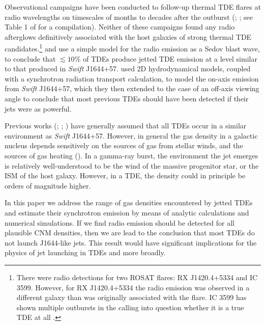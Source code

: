 \documentclass[usenatbib,fleqn]{mnras}
\begin{document}
Observational campaigns have been conducted to follow-up thermal TDE
flares at radio wavelengths on timescales of months to decades after
the outburst (\citealt{Bower+2013}; \citealt{van-Velzen+2013}; see
Table 1 of \citet{Mimica+2015} for a compilation). Neither of these
campaigns found any radio afterglows definitively associated with the
host galaxies of strong thermal TDE candidates.\footnote{There were
  radio detections for two ROSAT flares: RX J1420.4+5334 and IC
  3599. However, for RX J1420.4+5334 the radio emission was observed
  in a different galaxy than was originally associated with the flare.
  IC 3599 has shown multiple outbursts in the calling into question
  whether it is a true TDE at all \citep{Campana+2015}.}
\citet{Bower+2013} and \citet{van-Velzen+2013} use a simple model for
the radio emission as a Sedov blast wave, to conclude that $\lesssim
10\%$ of TDEs produce jetted TDE emission at a level similar to that
produced in {\it Swift} J1644+57.  \citet{Mimica+2015} used 2D
hydrodynamical models, coupled with a synchrotron radiation transport
calculation, to model the on-axis emission from {\it Swift} J1644+57,
which they then extended to the case of an off-axis viewing angle to
conclude that most previous TDEs should have been detected if their
jets were as powerful.

Previous works (\citet{Bower+2013}; \citet{van-Velzen+2013};
\citealt{Mimica+2015}) have generally assumed that all TDEs occur in a
similar environment as {\it Swift} J1644+57.  However, in general the
gas density in a galactic nucleus depends sensitively on the sources
of gas from stellar winds, and the sources of gas heating
(\citealt{Quataert2004,Generozov+2015}).  In a gamma-ray
burst, the environment the jet emerges is relatively well-understood
to be the wind of the massive progenitor star, or the ISM of the host
galaxy.  However, in a TDE, the density could in principle be orders
of magnitude higher.

In this paper we address the range of gas densities encountered by
jetted TDEs and estimate their synchrotron emission by means of
analytic calculations and numerical simulations.  If we find radio
emission should be detected for all plausible CNM densities, then we
are lead to the conclusion that most TDEs do not launch J1644-like
jets.  This result would have significant implications for the physics
of jet launching in TDEs and more broadly.
\end{document}
